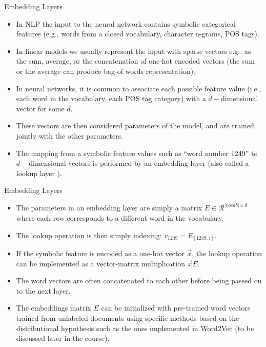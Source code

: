 \documentclass[handout]{beamer}
\begin{document}
\begin{frame}{Embedding Layers}
\begin{scriptsize}
\begin{itemize}

\item In NLP the input to the neural network contains symbolic categorical features (e.g., words from a closed vocabulary, character n-grams, POS tags).

\item In linear models we usually represent the input with sparse vectors e.g., as the sum, average,  or the concatenation of one-hot encoded vectors (the sum or the average can produce bag-of words representation). 

\item In neural networks, it is common to associate each possible feature value (i.e., each word in the vocabulary, each POS tag category) with a $d-$dimensional vector for some $d$.

\item These vectors are then considered parameters of the model, and are trained jointly with the other parameters.

\item The mapping from a symbolic feature values such as ``word number 1249'' to $d-$dimensional vectors is performed by an embedding layer (also called a lookup layer ).

\end{itemize}
\end{scriptsize}
\end{frame}


\begin{frame}{Embedding Layers}
\begin{scriptsize}
\begin{itemize}

\item The parameters in an embedding layer are simply a matrix $E \in \mathcal{R}^{|vocab|\times d}$ where each row corresponds to a different word in the vocabulary.

\item The lookup operation is then simply indexing: $v_{1249} = E_{[1249,:]}$.

\item If the symbolic feature is encoded as a one-hot vector $\vec{x}$, the lookup operation can be implemented as a vector-matrix multiplication $\vec{x}E$.

\item The word vectors are often concatenated to each other before being passed on to the next layer.


\item The embeddings matrix $E$ can be initialized with pre-trained word vectors trained from unlabeled documents using specific methods based on the distributional hypothesis such as the ones implemented in Word2Vec (to be discussed later in the course).


\end{itemize}
\end{scriptsize}
\end{frame}
\end{document}
